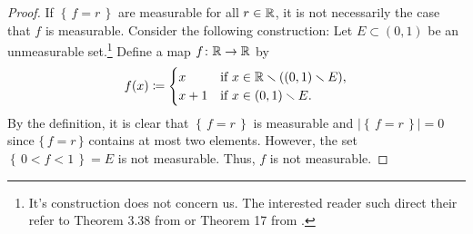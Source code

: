 \begin{proof}
If $\left\{\,f=r\,\right\}$ are measurable for all $r\in\mathbb{R}$, it is not
necessarily the case that $f$ is measurable. Consider the following
construction: Let $E\subset(0,1)$ be an unmeasurable set.\footnote{It's
  construction does not concern us. The interested reader such direct their
  refer to Theorem 3.38 from \cite[Ch.\@ 3, p.\@ 57-58]{wheeden-zygmund} or
  Theorem 17 from \cite[Ch.\@ 2\S 7, p.\@ 48]{royden}.} Define a map
$f\colon\mathbb{R}\to\mathbb{R}$ by
\begin{equation}
\label{eq:prep:1:11}
f(x)\coloneqq
\begin{cases}
x&\text{if $x\in\mathbb{R}\smallsetminus((0,1)\smallsetminus E)$},\\
x+1&\text{if $x\in (0,1)\smallsetminus E$.}
\end{cases}
\end{equation}
By the definition, it is clear that $\left\{\,f=r\,\right\}$ is measurable
and $\left|\left\{\,f=r\,\right\}\right|=0$ since $\{\,f=r\,\}$ contains at
most two elements. However, the set $\left\{\,0<f<1\,\right\}=E$ is not
measurable. Thus, $f$ is not measurable.
\end{proof}

